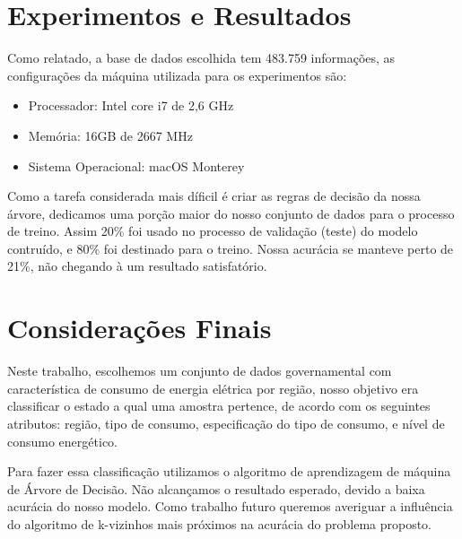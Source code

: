 \documentclass[12pt]{article}
\begin{document}
\newpage

\section{Experimentos e Resultados}
Como relatado, a base de dados escolhida tem 483.759 informações, as configurações da máquina utilizada para os experimentos são:
\begin{itemize}
    \item Processador: Intel core i7 de 2,6 GHz
    \item Memória: 16GB de 2667 MHz
    \item Sistema Operacional: macOS Monterey
\end{itemize}
Como a tarefa considerada mais díficil é criar as regras de decisão da nossa árvore, dedicamos uma porção maior do nosso conjunto de dados para o processo de treino. Assim 20\%  foi usado no processo de validação (teste) do modelo contruído, e 80\% foi destinado para o treino. Nossa acurácia se manteve perto de 21\%, não chegando à um resultado satisfatório.

\section{Considerações Finais}
Neste trabalho, escolhemos um conjunto de dados governamental com característica de consumo de energia elétrica por região, nosso objetivo era classificar o estado a qual uma amostra pertence, de acordo com os seguintes atributos: região, tipo de consumo, especificação do tipo de consumo, e nível de consumo energético. 

Para fazer essa classificação utilizamos o algoritmo de aprendizagem de máquina de Árvore de Decisão.  Não alcançamos o resultado esperado, devido a baixa acurácia do nosso modelo. Como trabalho futuro queremos averiguar a influência do algoritmo de k-vizinhos mais próximos na acurácia do problema proposto.




\end{document}
